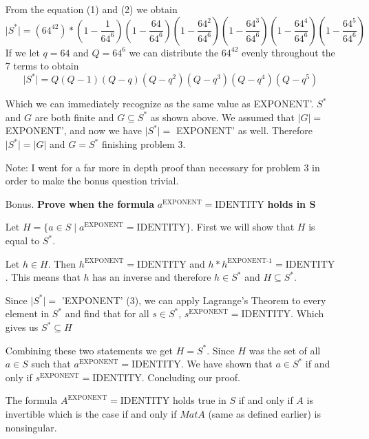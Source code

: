 \documentclass[12pt,letterpaper]{article}
\begin{document}
\begin{itemize}
        From the equation (1) and (2) we obtain 
        \begin{equation*}
            \lvert S^*\rvert = (64^{42})*(1-\frac{1}{64^6})(1-\frac{64}{64^6})(1-\frac{64^2}{64^6})(1-\frac{64^3}{64^6})(1-\frac{64^4}{64^6})(1-\frac{64^5}{64^6})
        \end{equation*}
        If we let $q=64$ and $Q=64^6$ we can distribute the $64^{42}$ evenly throughout the 7 terms to obtain
        \begin{equation}
            \lvert S^*\rvert = Q(Q-1)(Q-q)(Q-q^2)(Q-q^3)(Q-q^4)(Q-q^5)
        \end{equation}
        
        Which we can immediately recognize as the same value as EXPONENT'. $S^*$ and $G$ are both finite and $G\subseteq S^*$ as shown above. We assumed that $\lvert G\rvert=$ EXPONENT', and now we have $\lvert S^*\rvert=$ EXPONENT' as well. Therefore $\lvert S^*\rvert = \lvert G\rvert$ and $G=S^*$ finishing problem 3. \cite{Algebra}
        
        Note: I went for a far more in depth proof than necessary for problem 3 in order to make the bonus question trivial.
        
    \item [Bonus.] \textbf{Prove when the formula }$a^\text{EXPONENT}= \text{IDENTITY}$ \textbf{ holds in S}
    
        Let $H=\{a\in S \mid a^\text{EXPONENT}= \text{IDENTITY}\}$. First we will show that $H$ is equal to $S^*$. 
        
        Let $h\in H$. Then $h^\text{EXPONENT}= \text{IDENTITY}$ and $h*h^\text{EXPONENT-1}= \text{IDENTITY}$. This means that $h$ has an inverse and therefore $h\in S^*$ and $H\subseteq S^*$.
        
        Since $\lvert S^* \rvert = $ 'EXPONENT' (3), we can apply Lagrange's Theorem \cite{Algebra} to every element in $S^*$ and find that for all $s\in S^*$, $s^\text{EXPONENT}=\text{IDENTITY}$. Which gives us $S^*\subseteq H$
        
        Combining these two statements we get $H=S^*$. Since $H$ was the set of all $a\in S$ such that $a^\text{EXPONENT}= \text{IDENTITY}$. We have shown that $a\in S^*$ if and only if $s^\text{EXPONENT}= \text{IDENTITY}$. Concluding our proof.
        
        The formula $A^\text{EXPONENT}= \text{IDENTITY}$ holds true in $S$ if and only if $A$ is invertible which is the case if and only if $MatA$ (same as defined earlier) is nonsingular.
     

\end{itemize}
\end{document}
